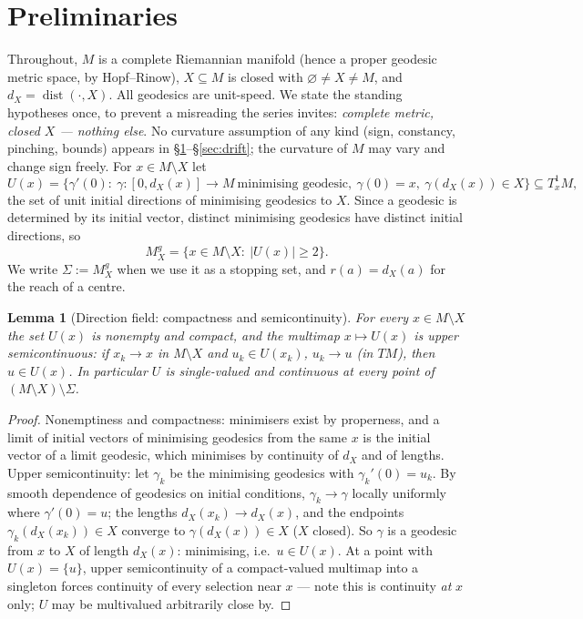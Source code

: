 \documentclass[11pt]{article}
\newtheorem{lemma}[theorem]{Lemma}
\theoremstyle{remark}
\newcommand{\X}{X}
\newcommand{\Mg}{M^{g}_{\X}}
\newcommand{\dist}{\operatorname{dist}}
\newcommand{\dX}{d_{\X}}
\begin{document}
\section{Preliminaries}\label{sec:prelim}

Throughout, $M$ is a complete Riemannian manifold (hence a proper
geodesic metric space, by Hopf--Rinow), $\X\subseteq M$ is closed with
$\varnothing\neq\X\neq M$, and $\dX=\dist(\cdot,\X)$. All geodesics are
unit-speed. We state the standing hypotheses once, to prevent a
misreading the series invites: \emph{complete metric, closed $\X$ ---
nothing else}. No curvature assumption of any kind (sign, constancy,
pinching, bounds) appears in
\S\ref{sec:prelim}--\S\ref{sec:drift}; the curvature of $M$ may vary
and change sign freely. For $x\in M\setminus\X$ let
\[
  U(x)=\bigl\{\gamma'(0):\ \gamma:[0,\dX(x)]\to M\ \text{minimising
  geodesic},\ \gamma(0)=x,\ \gamma(\dX(x))\in\X\bigr\}
  \subseteq T^{1}_{x}M ,
\]
the set of unit initial directions of minimising geodesics to $\X$.
Since a geodesic is determined by its initial vector, distinct
minimising geodesics have distinct initial directions, so
\[
  \Mg=\{x\in M\setminus\X:\ |U(x)|\ge2\}.
\]
We write $\Sigma:=\Mg$ when we use it as a stopping set, and
$r(a)=\dX(a)$ for the reach of a centre.

\begin{lemma}[Direction field: compactness and semicontinuity]
\label{lem:usc}
For every $x\in M\setminus\X$ the set $U(x)$ is nonempty and compact,
and the multimap $x\mapsto U(x)$ is upper semicontinuous: if
$x_{k}\to x$ in $M\setminus\X$ and $u_{k}\in U(x_{k})$, $u_{k}\to u$
(in $TM$), then $u\in U(x)$. In particular $U$ is single-valued and
continuous at every point of $(M\setminus\X)\setminus\Sigma$.
\end{lemma}

\begin{proof}
Nonemptiness and compactness: minimisers exist by properness, and a
limit of initial vectors of minimising geodesics from the same $x$ is
the initial vector of a limit geodesic, which minimises by continuity
of $\dX$ and of lengths. Upper semicontinuity: let
$\gamma_{k}$ be the minimising geodesics with
$\gamma_{k}'(0)=u_{k}$. By smooth dependence of geodesics on initial
conditions, $\gamma_{k}\to\gamma$ locally uniformly where
$\gamma'(0)=u$; the lengths $\dX(x_{k})\to\dX(x)$, and the endpoints
$\gamma_{k}(\dX(x_{k}))\in\X$ converge to $\gamma(\dX(x))\in\X$ ($\X$
closed). So $\gamma$ is a geodesic from $x$ to $\X$ of length
$\dX(x)$: minimising, i.e.\ $u\in U(x)$. At a point with
$U(x)=\{u\}$, upper semicontinuity of a compact-valued multimap into a
singleton forces continuity of every selection near $x$ --- note this
is continuity \emph{at} $x$ only; $U$ may be multivalued arbitrarily
close by.
\end{proof}
\end{document}
